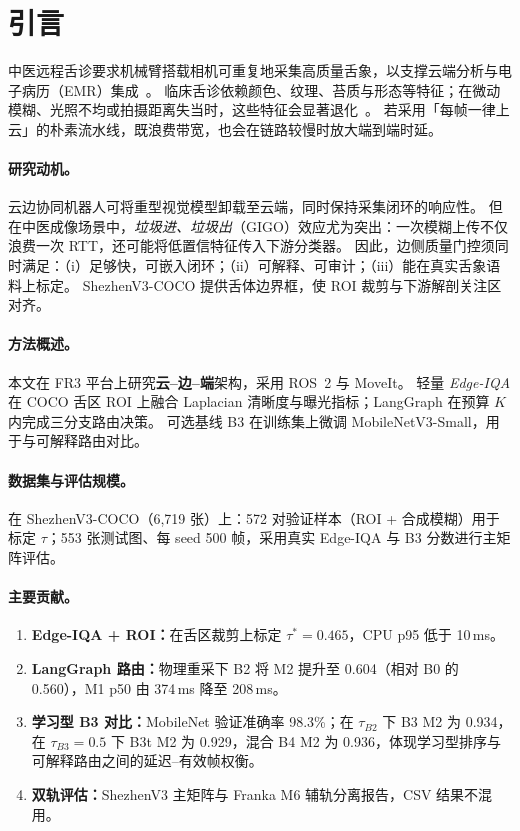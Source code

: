 \section{引言}
\label{sec:intro-zh}

中医远程舌诊要求机械臂搭载相机可重复地采集高质量舌象，以支撑云端分析与电子病历（EMR）集成~\cite{zhang2020tongue,qi2016tongue}。
临床舌诊依赖颜色、纹理、苔质与形态等特征；在微动模糊、光照不均或拍摄距离失当时，这些特征会显著退化~\cite{zhang2020tongue}。
若采用「每帧一律上云」的朴素流水线，既浪费带宽，也会在链路较慢时放大端到端时延。

\paragraph{研究动机。}
云边协同机器人可将重型视觉模型卸载至云端，同时保持采集闭环的响应性。
但在中医成像场景中，\emph{垃圾进、垃圾出}（GIGO）效应尤为突出：一次模糊上传不仅浪费一次 RTT，还可能将低置信特征传入下游分类器。
因此，边侧质量门控须同时满足：（i）足够快，可嵌入闭环；（ii）可解释、可审计；（iii）能在真实舌象语料上标定。
ShezhenV3-COCO 提供舌体边界框，使 ROI 裁剪与下游解剖关注区对齐。

\paragraph{方法概述。}
本文在 FR3 平台上研究\textbf{云--边--端}架构，采用 ROS~2 与 MoveIt。
轻量 \emph{Edge-IQA} 在 COCO 舌区 ROI 上融合 Laplacian 清晰度与曝光指标；LangGraph 在预算 $K$ 内完成三分支路由决策。
可选基线 B3 在训练集上微调 MobileNetV3-Small，用于与可解释路由对比。

\paragraph{数据集与评估规模。}
在 ShezhenV3-COCO（6{,}719 张）上：572 对验证样本（ROI + 合成模糊）用于标定 $\tau$；553 张测试图、每 seed 500 帧，采用真实 Edge-IQA 与 B3 分数进行主矩阵评估。

\paragraph{主要贡献。}
\begin{enumerate}
  \item \textbf{Edge-IQA + ROI：}在舌区裁剪上标定 $\tau^\ast{=}0.465$，CPU p95 低于 10\,ms。
  \item \textbf{LangGraph 路由：}物理重采下 B2 将 M2 提升至 0.604（相对 B0 的 0.560），M1 p50 由 374\,ms 降至 208\,ms。
  \item \textbf{学习型 B3 对比：}MobileNet 验证准确率 98.3\%；在 $\tau_{B2}$ 下 B3 M2 为 0.934，在 $\tau_{B3}{=}0.5$ 下 B3t M2 为 0.929，混合 B4 M2 为 0.936，体现学习型排序与可解释路由之间的延迟--有效帧权衡。
  \item \textbf{双轨评估：}ShezhenV3 主矩阵与 Franka M6 辅轨分离报告，CSV 结果不混用。
\end{enumerate}

